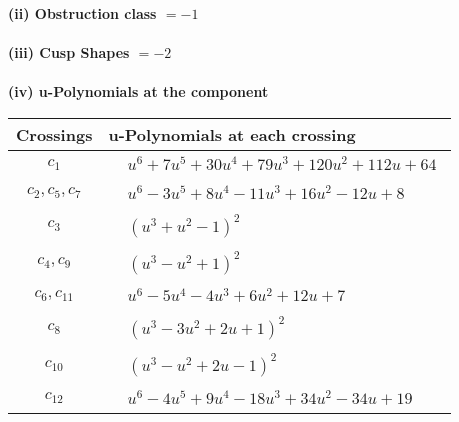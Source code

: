 \documentclass[1p]{elsarticle_modified}
\theoremstyle{definition}
\begin{document}
\flushleft \textbf{(ii) Obstruction class $= -1$}\\~\\
\flushleft \textbf{(iii) Cusp Shapes $= -2$}\\~\\
\newpage\renewcommand{\arraystretch}{1}
\flushleft \textbf{(iv) u-Polynomials at the component}\newline \\
\begin{tabular}{m{50pt}|m{274pt}}
Crossings & \hspace{64pt}u-Polynomials at each crossing \\
\hline $$\begin{aligned}c_{1}\end{aligned}$$&$\begin{aligned}
&u^6+7 u^5+30 u^4+79 u^3+120 u^2+112 u+64
\end{aligned}$\\
\hline $$\begin{aligned}c_{2},c_{5},c_{7}\end{aligned}$$&$\begin{aligned}
&u^6-3 u^5+8 u^4-11 u^3+16 u^2-12 u+8
\end{aligned}$\\
\hline $$\begin{aligned}c_{3}\end{aligned}$$&$\begin{aligned}
&(u^3+u^2-1)^2
\end{aligned}$\\
\hline $$\begin{aligned}c_{4},c_{9}\end{aligned}$$&$\begin{aligned}
&(u^3- u^2+1)^2
\end{aligned}$\\
\hline $$\begin{aligned}c_{6},c_{11}\end{aligned}$$&$\begin{aligned}
&u^6-5 u^4-4 u^3+6 u^2+12 u+7
\end{aligned}$\\
\hline $$\begin{aligned}c_{8}\end{aligned}$$&$\begin{aligned}
&(u^3-3 u^2+2 u+1)^2
\end{aligned}$\\
\hline $$\begin{aligned}c_{10}\end{aligned}$$&$\begin{aligned}
&(u^3- u^2+2 u-1)^2
\end{aligned}$\\
\hline $$\begin{aligned}c_{12}\end{aligned}$$&$\begin{aligned}
&u^6-4 u^5+9 u^4-18 u^3+34 u^2-34 u+19
\end{aligned}$\\
\hline
\end{tabular}\\~\\
\end{document}
